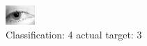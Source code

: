 \begin{figure}[h!]
\begin{center}
\includegraphics[width=0.60\columnwidth]{figures/ID1412_class_4_target_3.png}
\end{center}
\caption{ Classification: 4 actual target: 3}
\label{fig:ID1412_class_4_target_3}
\end{figure}
